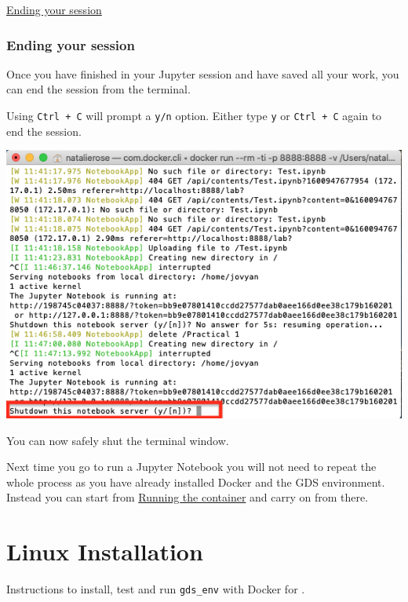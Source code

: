 \documentclass[
]{book}
\begin{document}
\protect\hyperlink{ending-your-session}{Ending your session}

\hypertarget{ending-your-session}{%
\subsection*{Ending your session}\label{ending-your-session}}

Once you have finished in your Jupyter session and have saved all your work, you can end the session from the terminal.

Using \texttt{Ctrl\ +\ C} will prompt a \texttt{y/n} option. Either type \texttt{y} or \texttt{Ctrl\ +\ C} again to end the session.

\begin{center}\includegraphics[width=8.03in]{figs/chp1/Figure16} \end{center}

You can now safely shut the terminal window.

Next time you go to run a Jupyter Notebook you will not need to repeat the whole process as you have already installed Docker and the GDS environment. Instead you can start from \protect\hyperlink{running-the-container}{Running the container} and carry on from there.

\hypertarget{linux-installation}{%
\chapter*{Linux Installation}\label{linux-installation}}

Instructions to install, test and run \texttt{gds\_env} with Docker for .
\end{document}
